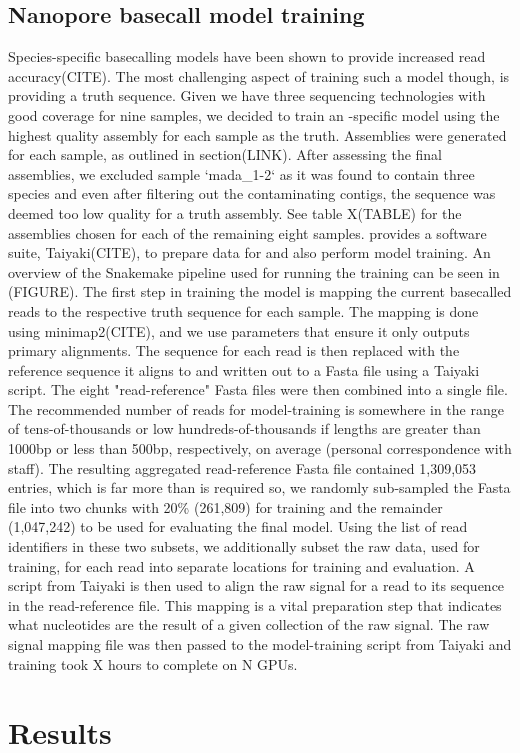 \begin{markdown}
\subsection{Nanopore basecall model training}
Species-specific \ont{} basecalling models have been shown to provide increased read accuracy(CITE). The most challenging aspect of training such a model though, is providing a truth sequence. Given we have three sequencing technologies with good coverage for nine samples, we decided to train an \mtb-specific model using the highest quality assembly for each sample as the truth.  
Assemblies were generated for each sample, as outlined in section(LINK). After assessing the final assemblies, we excluded sample `mada_1-2` as it was found to contain three species and even after filtering out the contaminating contigs, the \mtb{} sequence was deemed too low quality for a truth assembly. See table X(TABLE) for the assemblies chosen for each of the remaining eight samples.  
\ont{} provides a software suite, Taiyaki(CITE), to prepare data for and also perform model training. An overview of the Snakemake pipeline used for running the training can be seen in (FIGURE). The first step in training the model is mapping the current basecalled reads to the respective truth sequence for each sample. The mapping is done using minimap2(CITE), and we use parameters that ensure it only outputs primary alignments. The sequence for each read is then replaced with the reference sequence it aligns to and written out to a Fasta file using a Taiyaki script. The eight "read-reference" Fasta files were then combined into a single file. The recommended number of reads for model-training is somewhere in the range of tens-of-thousands or low hundreds-of-thousands if lengths are greater than 1000bp or less than 500bp, respectively, on average (personal correspondence with \ont{} staff). The resulting aggregated read-reference Fasta file contained 1,309,053 entries, which is far more than is required so, we randomly sub-sampled the Fasta file into two chunks with 20\% (261,809) for training and the remainder (1,047,242) to be used for evaluating the final model. Using the list of read identifiers in these two subsets, we additionally subset the raw data, used for training, for each read into separate locations for training and evaluation. A script from Taiyaki is then used to align the raw signal for a read to its sequence in the read-reference file. This mapping is a vital preparation step that indicates what nucleotides are the result of a given collection of the raw signal. The raw signal mapping file was then passed to the model-training script from Taiyaki and training took X hours to complete on N GPUs.



\section{Results}





\end{markdown}